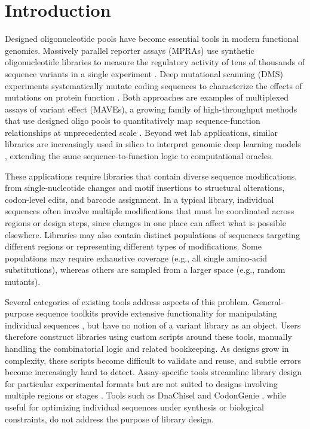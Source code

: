 \documentclass[unnumsec,webpdf,modern,large]{mam-authoring-template}%
\theoremstyle{thmstyleone}%
\theoremstyle{thmstyletwo}%
\theoremstyle{thmstylethree}%
\begin{document}
\maketitle

\section{Introduction}

Designed oligonucleotide pools have become essential tools in modern functional genomics. Massively parallel reporter assays (MPRAs) use synthetic oligonucleotide libraries to measure the regulatory activity of tens of thousands of sequence variants in a single experiment \citep{Inoue2015cs}. Deep mutational scanning (DMS) experiments systematically mutate coding sequences to characterize the effects of mutations on protein function \citep{Fowler2014gq}. Both approaches are examples of multiplexed assays of variant effect (MAVEs), a growing family of high-throughput methods that use designed oligo pools to quantitatively map sequence-function relationships at unprecedented scale \citep{Kinney2019jc}. Beyond wet lab applications, similar libraries are increasingly used in silico to interpret genomic deep learning models \citep{Avsec2021bpnet, Nagai2026review}, extending the same sequence-to-function logic to computational oracles.

These applications require libraries that contain diverse sequence modifications, from single-nucleotide changes and motif insertions to structural alterations, codon-level edits, and barcode assignment. In a typical library, individual sequences often involve multiple modifications that must be coordinated across regions or design steps, since changes in one place can affect what is possible elsewhere. Libraries may also contain distinct populations of sequences targeting different regions or representing different types of modifications. Some populations may require exhaustive coverage (e.g., all single amino-acid substitutions), whereas others are sampled from a larger space (e.g., random mutants).

Several categories of existing tools address aspects of this problem. General-purpose sequence toolkits provide extensive functionality for manipulating individual sequences \citep{Cock2009df, Schreiber2025nd, Pereira2015wj, Klie2023kg}, but have no notion of a variant library as an object. Users therefore construct libraries using custom scripts around these tools, manually handling the combinatorial logic and related bookkeeping. As designs grow in complexity, these scripts become difficult to validate and reuse, and subtle errors become increasingly hard to detect. Assay-specific tools streamline library design for particular experimental formats but are not suited to designs involving multiple regions or stages \citep{GeorgakopoulosSoares2017gb, Ghazi2018aa, Barbon2022th}. Tools such as DnaChisel \citep{Zulkower2020jk} and CodonGenie \citep{Swainston2017rb}, while useful for optimizing individual sequences under synthesis or biological constraints, do not address the purpose of library design.
\end{document}
